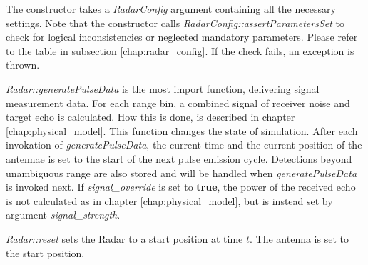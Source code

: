 \documentclass[letterpaper]{book}
\begin{document}
The constructor takes a \textit{RadarConfig} argument containing all the necessary settings. Note that the constructor calls \textit{RadarConfig::assertParametersSet} to check for logical inconsistencies or neglected mandatory parameters. Please refer to the table in subsection \ref{chap:radar_config}. If the check fails, an exception is thrown. 

\textit{Radar::generatePulseData} is the most import function, delivering signal measurement data. For each range bin, a combined signal of receiver noise and target echo is calculated. How this is done, is described in chapter \ref{chap:physical_model}. This function changes the state of simulation. After each invokation of \textit{generatePulseData}, the current time and the current position of the antennae is set to the start of the next pulse emission cycle. Detections beyond unambiguous range are also stored and will be handled when \textit{generatePulseData} is invoked next. If \textit{signal\_override} is set to \textbf{true}, the power of the received echo is not calculated as in chapter \ref{chap:physical_model}, but is instead set by argument \textit{signal\_strength}. 

\textit{Radar::reset} sets the Radar to a start position at time \(t\). The antenna is set to the start position. 
\end{document}
